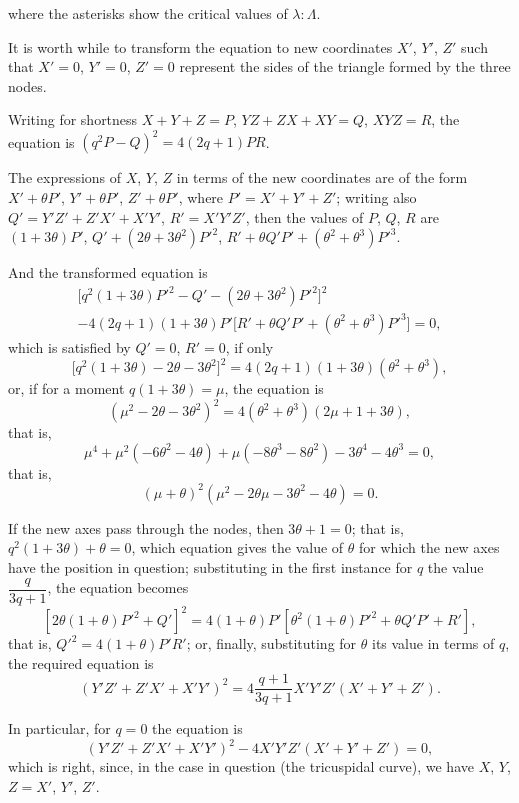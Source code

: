 \documentclass[11pt,a4paper]{book}
\begin{document}
where the asterisks show the critical values of $\lambda : \Lambda$.

\newpage
\setcounter{page}{5}

It is worth while to transform the equation to new coordinates $X'$, $Y'$, $Z'$ such that $X' = 0$, $Y' = 0$, $Z' = 0$ represent the sides of the triangle formed by the three nodes.

Writing for shortness $X + Y + Z = P$, $YZ + ZX + XY = Q$, $XYZ = R$, the equation is $(q^2P - Q)^2 = 4(2q + 1)PR$.

The expressions of $X$, $Y$, $Z$ in terms of the new coordinates are of the form $X' + \theta P'$, $Y' + \theta P'$, $Z' + \theta P'$, where $P' = X' + Y' + Z'$; writing also $Q' = Y'Z' + Z'X' + X'Y'$, $R' = X'Y'Z'$, then the values of $P$, $Q$, $R$ are $(1 + 3\theta)P'$, $Q' + (2\theta + 3\theta^2)P'^2$, $R' + \theta Q'P' + (\theta^2 + \theta^3)P'^3$.

And the transformed equation is
\begin{multline*}
\bigl[q^2(1 + 3\theta)P'^2 - Q' - (2\theta + 3\theta^2)P'^2\bigr]^2 \\
- 4(2q + 1)(1 + 3\theta)P'\bigl[R' + \theta Q'P' + (\theta^2 + \theta^3)P'^3\bigr] = 0,
\end{multline*}
which is satisfied by $Q' = 0$, $R' = 0$, if only
\[
\bigl[q^2(1 + 3\theta) - 2\theta - 3\theta^2\bigr]^2 = 4(2q + 1)(1 + 3\theta)(\theta^2 + \theta^3),
\]
or, if for a moment $q(1 + 3\theta) = \mu$, the equation is
\[
(\mu^2 - 2\theta - 3\theta^2)^2 = 4(\theta^2 + \theta^3)(2\mu + 1 + 3\theta),
\]
that is,
\[
\mu^4 + \mu^2(-6\theta^2 - 4\theta) + \mu(-8\theta^3 - 8\theta^2) - 3\theta^4 - 4\theta^3 = 0,
\]
that is,
\[
(\mu + \theta)^2(\mu^2 - 2\theta\mu - 3\theta^2 - 4\theta) = 0.
\]

If the new axes pass through the nodes, then $3\theta + 1 = 0$; that is, $q^2(1 + 3\theta) + \theta = 0$, which equation gives the value of $\theta$ for which the new axes have the position in question; substituting in the first instance for $q$ the value $\dfrac{q}{3q+1}$, the equation becomes
\[
[2\theta(1 + \theta)P'^2 + Q']^2 = 4(1 + \theta)P'[\theta^2(1 + \theta)P'^2 + \theta Q'P' + R'],
\]
that is, $Q'^2 = 4(1 + \theta)P'R'$; or, finally, substituting for $\theta$ its value in terms of $q$, the required equation is
\[
(Y'Z' + Z'X' + X'Y')^2 = 4\frac{q+1}{3q+1}X'Y'Z'(X' + Y' + Z').
\]

In particular, for $q = 0$ the equation is
\[
(Y'Z' + Z'X' + X'Y')^2 - 4X'Y'Z'(X' + Y' + Z') = 0,
\]
which is right, since, in the case in question (the tricuspidal curve), we have $X$, $Y$, $Z = X'$, $Y'$, $Z'$.
\end{document}
